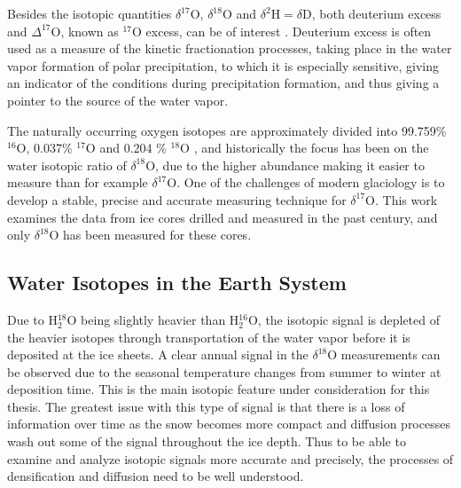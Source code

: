 \documentclass[../../CompleteThesis2/Complete_2ndDraft]{subfiles}
\begin{document}
Besides the isotopic quantities $\delta^{17}\text{O}$, $\delta^{18}\text{O}$ and $\delta^2\text{H} = \delta\text{D}$, both deuterium excess and $\Delta^{17}\text{O}$, known as $^{17}\text{O}$ excess, can be of interest \cite[K. Lamb et al., 2017]{Lamb2017}. Deuterium excess is often used as a measure of the kinetic fractionation processes, taking place in the water vapor formation of polar precipitation, to which it is especially sensitive, giving an indicator of the conditions during precipitation formation, and thus giving a pointer to the source of the water vapor.


The naturally occurring oxygen isotopes are approximately divided into 99.759\% $^{16}\text{O}$, 0.037\% $^{17}\text{O}$ and 0.204 \% $^{18}\text{O}$ \cite{NUBASE2016}, and historically the focus has been on the water isotopic ratio of $\delta^{18}$O, due to the higher abundance making it easier to measure than for example $\delta^{17}$O. One of the challenges of modern glaciology is to develop a stable, precise and accurate measuring technique for $\delta^{17}$O. This work examines the data from ice cores drilled and measured in the past century, and only $\delta^{18}$O has been measured for these cores.

\subsection[Relation to Temperature]{Water Isotopes in the Earth System}
\label{Subsec:Ice_WaterIsotopes_EarthSystem}


Due to H$_2^{18}$O being slightly heavier than H$_2^{16}$O, the isotopic signal is depleted of the heavier isotopes through transportation of the water vapor before it is deposited at the ice sheets. A clear annual signal in the $\delta^{18}$O measurements can be observed due to the seasonal temperature changes from summer to winter at deposition time. This is the main isotopic feature under consideration for this thesis. The greatest issue with this type of signal is that there is a loss of information over time as the snow becomes more compact and diffusion processes wash out some of the signal throughout the ice depth. Thus to be able to examine and analyze isotopic signals more accurate and precisely, the processes of densification and diffusion need to be well understood.
\end{document}
